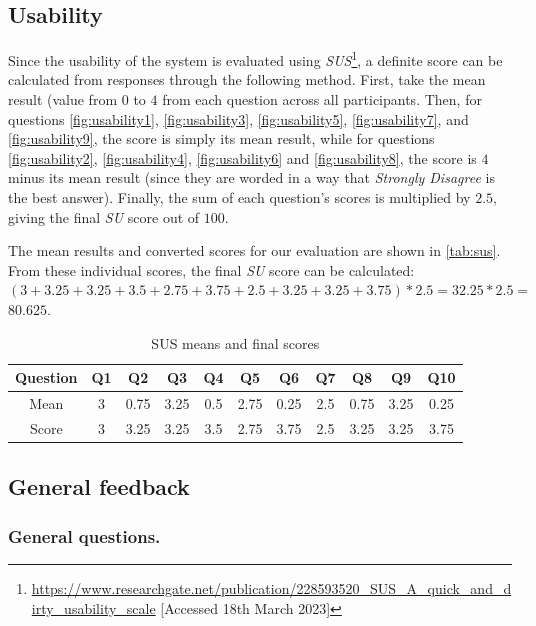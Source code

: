 \documentclass{l4proj}
\begin{document}
\subsection{Usability}
Since the usability of the system is evaluated using \emph{SUS}\footnote{\url{https://www.researchgate.net/publication/228593520_SUS_A_quick_and_dirty_usability_scale} [Accessed 18th March 2023]}, a definite score can be calculated from responses through the following method. First, take the mean result (value from $0$ to $4$ from each question across all participants. Then, for questions \autoref{fig:usability1}, \autoref{fig:usability3}, \autoref{fig:usability5}, \autoref{fig:usability7}, and \autoref{fig:usability9}, the score is simply its mean result, while for questions \autoref{fig:usability2}, \autoref{fig:usability4}, \autoref{fig:usability6} and \autoref{fig:usability8}, the score is $4$ minus its mean result (since they are worded in a way that \emph{Strongly Disagree} is the best answer). Finally, the sum of each question's scores is multiplied by $2.5$, giving the final \emph{SU} score out of $100$.

The mean results and converted scores for our evaluation are shown in \autoref{tab:sus}. From these individual scores, the final \emph{SU} score can be calculated: $(3 + 3.25 + 3.25 + 3.5 + 2.75 + 3.75 + 2.5 + 3.25 + 3.25 + 3.75) * 2.5 = 32.25 * 2.5 =$ \textbf{$80.625$}.

\begin{table}[h]
\begin{center}
\begin{tabular}{| c || c | c | c | c | c | c | c | c | c | c |}
	\hline
	Question & Q1 & Q2 & Q3 & Q4 & Q5 & Q6 & Q7 & Q8 & Q9 & Q10 \\
	\hline
	\hline
	Mean & 3 & 0.75 & 3.25 & 0.5 & 2.75 & 0.25 & 2.5 & 0.75 & 3.25 & 0.25 \\
	\hline
	Score & 3 & 3.25 & 3.25 & 3.5 & 2.75 & 3.75 & 2.5 & 3.25 & 3.25 & 3.75 \\
	\hline
\end{tabular}
\caption{\label{tab:sus}SUS means and final scores}
\end{center}
\end{table}

\subsection{General feedback}

\subsubsection{General questions.}
\label{sec:personal_questions}
\end{document}
